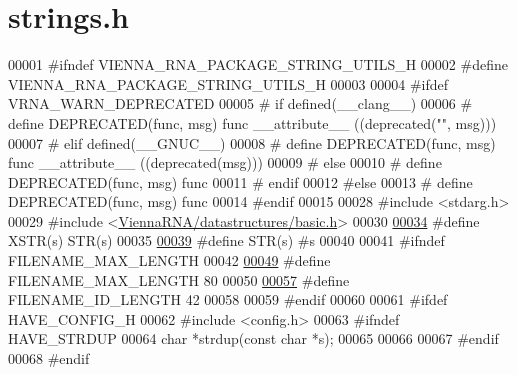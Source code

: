 \hypertarget{strings_8h_source}{}\section{strings.\+h}
\label{strings_8h_source}

\begin{DoxyCode}
00001 \textcolor{preprocessor}{#ifndef VIENNA\_RNA\_PACKAGE\_STRING\_UTILS\_H}
00002 \textcolor{preprocessor}{#define VIENNA\_RNA\_PACKAGE\_STRING\_UTILS\_H}
00003 
00004 \textcolor{preprocessor}{#ifdef VRNA\_WARN\_DEPRECATED}
00005 \textcolor{preprocessor}{# if defined(\_\_clang\_\_)}
00006 \textcolor{preprocessor}{#  define DEPRECATED(func, msg) func \_\_attribute\_\_ ((deprecated("", msg)))}
00007 \textcolor{preprocessor}{# elif defined(\_\_GNUC\_\_)}
00008 \textcolor{preprocessor}{#  define DEPRECATED(func, msg) func \_\_attribute\_\_ ((deprecated(msg)))}
00009 \textcolor{preprocessor}{# else}
00010 \textcolor{preprocessor}{#  define DEPRECATED(func, msg) func}
00011 \textcolor{preprocessor}{# endif}
00012 \textcolor{preprocessor}{#else}
00013 \textcolor{preprocessor}{# define DEPRECATED(func, msg) func}
00014 \textcolor{preprocessor}{#endif}
00015 
00028 \textcolor{preprocessor}{#include <stdarg.h>}
00029 \textcolor{preprocessor}{#include <\hyperlink{datastructures_2basic_8h}{ViennaRNA/datastructures/basic.h}>}
00030 
\hyperlink{group__string__utils_ga03943706e48069237cd57f2d35ca987e}{00034} \textcolor{preprocessor}{#define XSTR(s) STR(s)}
00035 
\hyperlink{group__string__utils_ga6388870e639eee9c0a69446876f1f8cc}{00039} \textcolor{preprocessor}{#define STR(s) #s}
00040 
00041 \textcolor{preprocessor}{#ifndef FILENAME\_MAX\_LENGTH}
00042 
\hyperlink{group__string__utils_gafb228174279df9486a5cb56ac0bc79a3}{00049} \textcolor{preprocessor}{#define FILENAME\_MAX\_LENGTH   80}
00050 
\hyperlink{group__string__utils_ga33c3b1826b8e2739f09f111ec719ded5}{00057} \textcolor{preprocessor}{#define FILENAME\_ID\_LENGTH    42}
00058 
00059 \textcolor{preprocessor}{#endif}
00060 
00061 \textcolor{preprocessor}{#ifdef HAVE\_CONFIG\_H}
00062 \textcolor{preprocessor}{#include <config.h>}
00063 \textcolor{preprocessor}{#ifndef HAVE\_STRDUP}
00064 \textcolor{keywordtype}{char} *strdup(\textcolor{keyword}{const} \textcolor{keywordtype}{char} *s);
00065 
00066 
00067 \textcolor{preprocessor}{#endif}
00068 \textcolor{preprocessor}{#endif}

\end{DoxyCode}
